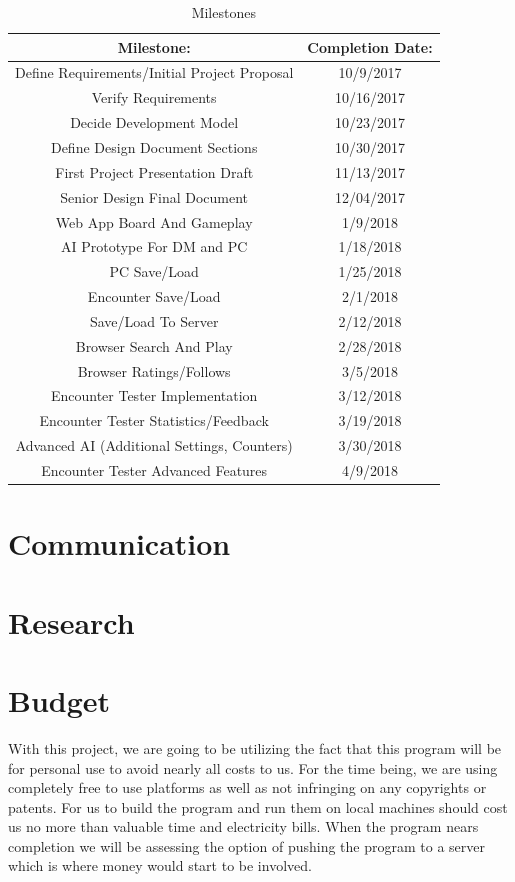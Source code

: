 \documentclass[12pt,a4paper]{report}
\begin{document}
	\begin{table}[H]
		\begin{center}
			\begin{tabular}{ |c|c| } 
				\hline
				Milestone: & Completion Date: \\
				\hline
				Define Requirements/Initial Project Proposal & 10/9/2017 \\
				Verify Requirements & 10/16/2017 \\
				Decide Development Model & 10/23/2017 \\
				Define Design Document Sections & 10/30/2017 \\
				First Project Presentation Draft & 11/13/2017 \\
				Senior Design Final Document & 12/04/2017 \\
				Web App Board And Gameplay & 1/9/2018 \\
				AI Prototype For DM and PC & 1/18/2018 \\ 
				PC Save/Load & 1/25/2018 \\
				Encounter Save/Load & 2/1/2018 \\
				Save/Load To Server & 2/12/2018 \\
				Browser Search And Play & 2/28/2018 \\
				Browser Ratings/Follows & 3/5/2018 \\
				Encounter Tester Implementation & 3/12/2018 \\
				Encounter Tester Statistics/Feedback & 3/19/2018 \\
				Advanced AI (Additional Settings, Counters) & 3/30/2018 \\
				Encounter Tester Advanced Features & 4/9/2018 \\	
				\hline
			\end{tabular}
		\end{center}
		\caption{Milestones} \label{table: milestones}
	\end{table}
	
	\section{Communication}
	\section{Research}
	\section{Budget}
	With this project, we are going to be utilizing the fact that this program will be for personal use to avoid nearly all costs to us. For the time being, we are using completely free to use platforms as well as not infringing on any copyrights or patents. For us to build the program and run them on local machines should cost us no more than valuable time and electricity bills. When the program nears completion we will be assessing the option of pushing the program to a server which is where money would start to be involved.
	
\end{document}
